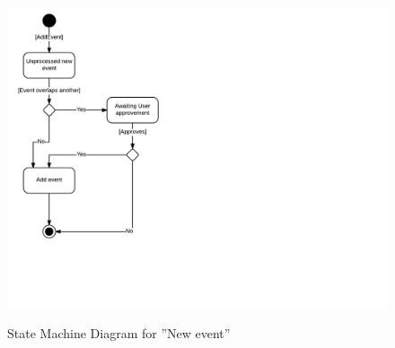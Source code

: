 \documentclass{article}
\begin{document}
	\begin{figure}[!htb]
                \caption{State Machine Diagram for ''New event''}
		\includegraphics[scale = 0.6]{NewEventStateMachine}\\
		\pagebreak{}
	\end{figure}
\end{document}
